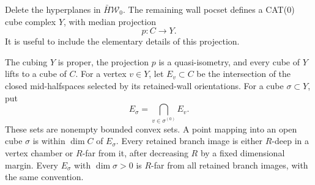 Delete the hyperplanes in \(\bar H\mathcal W_0\).  The remaining wall
pocset defines a CAT(0) cube complex \(Y\), with median projection
\cite[Lecture~2, Sections~2 and~5.2]{Sageev2014}
\begin{equation}
 p:C\longrightarrow Y.
 \label{fill:median}
\end{equation}
It is useful to include the elementary details of this projection.

\begin{lemma}\label{fill:collapse}
The cubing \(Y\) is proper, the projection \(p\) is a quasi-isometry, and
every cube of \(Y\) lifts to a cube of \(C\).
For a vertex \(v\in Y\), let \(E_v\subset C\) be the intersection of the
closed mid-halfspaces selected by its retained-wall orientations.  For a
cube \(\sigma\subset Y\), put
\begin{equation}
 E_\sigma=\bigcap_{v\in\sigma^{(0)}}E_v.
 \label{fill:chambers}
\end{equation}
These sets are nonempty bounded convex sets.  A point mapping into an open
cube \(\sigma\) is within \(\dim C\) of \(E_\sigma\).
Every retained branch image is either \(R\)-deep in a vertex chamber or
\(R\)-far from it, after decreasing \(R\) by a fixed dimensional margin.
Every \(E_\sigma\) with \(\dim\sigma>0\) is \(R\)-far from all retained
branch images, with the same convention.
\end{lemma}

